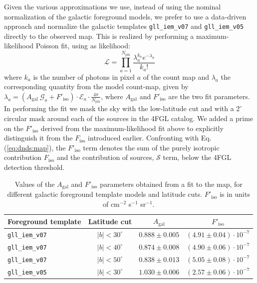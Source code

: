 Given the various approximations we use, instead of using the nominal normalization of the galactic foreground models, we prefer to use a data-driven approach and normalize 
the galactic templates \verb|gll_iem_v07| and \verb|gll_iem_v05| directly to the observed \fermi map. This is realized by performing a maximum-likelihood Poisson fit, using as likelihood:
%
\begin{equation}
\mathcal{L}=\prod_{a=1}^{N_\textrm{pix}} \frac{\lambda_{a}^{k_{a}} e^{-\lambda_{a}}}{k_{a} !}
\end{equation}
%
where $k_a$ is the number of photons in pixel $a$ of the \fermi count map and $\lambda_a$ the corresponding quantity from the model count-map, given by $\lambda_a = (A_\textrm{gal}\ \mathcal{G}_a + F'_\textrm{iso}) \cdot \mathcal{E}_a \cdot \frac{4\pi}{N_\textrm{pix}} $, where $A_\textrm{gal}$ and $F'_\textrm{iso}$ are the two fit parameters. In performing the fit we mask the sky with the low-latitude cut and with a $2^\circ$ circular mask around each of the sources in the 4FGL catalog. 
We added a prime on the $F'_\textrm{iso}$ derived from the maximum-likelihood fit above to explicitly distinguish it from the $F_\textrm{iso}$ introduced earlier.
Confronting with Eq. (\ref{eq:dnds:map}), the $F'_\textrm{iso}$ term denotes the sum of the purely isotropic contribution $F_\textrm{iso}$  and the contribution of sources, $\mathcal{S}$ term, below the 4FGL detection threshold.


\begin{table}[t]
\centering
\begin{tabular}{|l|c|c|c|}
\hline
Foreground template & Latitude cut & $A_\textrm{gal}$ & $F'_\textrm{iso}$ \\
\hline
\verb|gll_iem_v07| & $|b|<30^\circ$ & $0.888 \pm 0.005$ & $(4.91  \pm 0.04 ) \cdot 10^{-7}$ \\
\verb|gll_iem_v07| & $|b|<40^\circ$ & $0.874 \pm 0.008$ & $(4.90  \pm 0.06 ) \cdot 10^{-7}$ \\
\verb|gll_iem_v07| & $|b|<50^\circ$ & $0.838 \pm 0.013$ & $(5.05  \pm 0.08 ) \cdot 10^{-7}$ \\
\hline
\verb|gll_iem_v05| & $|b|<30^\circ$ & $1.030 \pm 0.006$ & $(2.57  \pm 0.06 ) \cdot 10^{-7}$ \\
\hline 
\end{tabular}
\caption{Values of the $A_\textrm{gal}$ and $F'_\textrm{iso}$ parameters obtained from a fit to the \fermi map, for different galactic foreground template models and latitude cuts. $F'_\textrm{iso}$ is in units of cm$^{-2}$ s$^{-1}$ sr$^{-1}$.}
\label{tab:fore-parameters}
\end{table}

